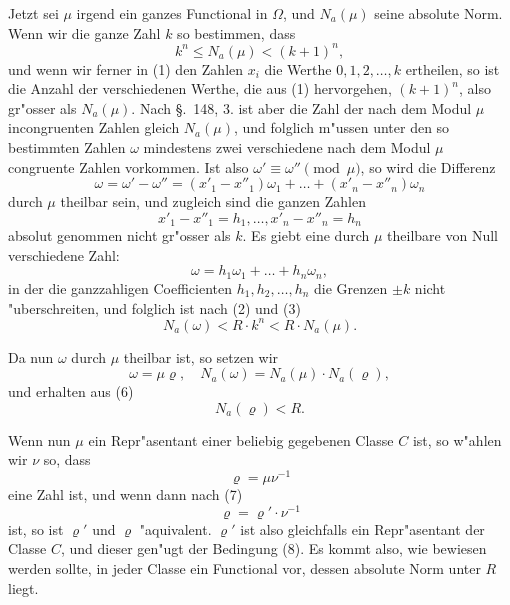 \documentclass[12pt,a4paper]{article}
\theoremstyle{definition}
\begin{document}
Jetzt sei $\mu$ irgend ein ganzes Functional in $\Omega$, und $N_a(\mu)$ seine absolute Norm. Wenn wir die ganze Zahl $k$ so bestimmen, dass
\begin{equation}
k^n \leq N_a(\mu) < (k+1)^n,
\end{equation}
und wenn wir ferner in (1) den Zahlen $x_i$ die Werthe $0, 1, 2, \dots, k$ ertheilen, so ist die Anzahl der verschiedenen Werthe, die aus (1) hervorgehen, $(k+1)^n$, also gr"osser als $N_a(\mu)$. Nach \S.~148, 3. ist aber die Zahl der nach dem Modul $\mu$ incongruenten Zahlen gleich $N_a(\mu)$, und folglich m"ussen unter den so bestimmten Zahlen $\omega$ mindestens zwei verschiedene nach dem Modul $\mu$ congruente Zahlen vorkommen. Ist also $\omega' \equiv \omega'' \pmod{\mu}$, so wird die Differenz
\begin{equation}
\omega = \omega' - \omega'' = (x'_1 - x''_1)\omega_1 + \dots + (x'_n - x''_n)\omega_n
\end{equation}
durch $\mu$ theilbar sein, und zugleich sind die ganzen Zahlen
\begin{equation}
x'_1 - x''_1 = h_1, \dots, x'_n - x''_n = h_n
\end{equation}
absolut genommen nicht gr"osser als $k$. Es giebt eine durch $\mu$ theilbare von Null verschiedene Zahl:
\begin{equation}
\omega = h_1\omega_1 + \dots + h_n\omega_n,
\end{equation}
in der die ganzzahligen Coefficienten $h_1, h_2, \dots, h_n$ die Grenzen $\pm k$ nicht "uberschreiten, und folglich ist nach (2) und (3)
\begin{equation}
N_a(\omega) < R \cdot k^n < R \cdot N_a(\mu).
\end{equation}

Da nun $\omega$ durch $\mu$ theilbar ist, so setzen wir
\begin{equation}
\omega = \mu\varrho, \quad N_a(\omega) = N_a(\mu) \cdot N_a(\varrho),
\end{equation}
und erhalten aus (6)
\begin{equation}
N_a(\varrho) < R.
\end{equation}

Wenn nun $\mu$ ein Repr"asentant einer beliebig gegebenen Classe $C$ ist, so w"ahlen wir $\nu$ so, dass
\begin{equation}
\varrho = \mu\nu^{-1}
\end{equation}
eine Zahl ist, und wenn dann nach (7)
\begin{equation}
\varrho = \varrho' \cdot \nu^{-1}
\end{equation}
ist, so ist $\varrho'$ und $\varrho$ "aquivalent. $\varrho'$ ist also gleichfalls ein Repr"asentant der Classe $C$, und dieser gen"ugt der Bedingung (8). Es kommt also, wie bewiesen werden sollte, in jeder Classe ein Functional vor, dessen absolute Norm unter $R$ liegt.
\end{document}
